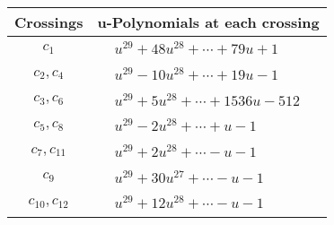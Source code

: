 \documentclass[1p]{elsarticle_modified}
\theoremstyle{definition}
\begin{document}
\begin{tabular}{m{50pt}|m{274pt}}
Crossings & \hspace{64pt}u-Polynomials at each crossing \\
\hline $$\begin{aligned}c_{1}\end{aligned}$$&$\begin{aligned}
&u^{29}+48 u^{28}+\cdots+79 u+1
\end{aligned}$\\
\hline $$\begin{aligned}c_{2},c_{4}\end{aligned}$$&$\begin{aligned}
&u^{29}-10 u^{28}+\cdots+19 u-1
\end{aligned}$\\
\hline $$\begin{aligned}c_{3},c_{6}\end{aligned}$$&$\begin{aligned}
&u^{29}+5 u^{28}+\cdots+1536 u-512
\end{aligned}$\\
\hline $$\begin{aligned}c_{5},c_{8}\end{aligned}$$&$\begin{aligned}
&u^{29}-2 u^{28}+\cdots+u-1
\end{aligned}$\\
\hline $$\begin{aligned}c_{7},c_{11}\end{aligned}$$&$\begin{aligned}
&u^{29}+2 u^{28}+\cdots- u-1
\end{aligned}$\\
\hline $$\begin{aligned}c_{9}\end{aligned}$$&$\begin{aligned}
&u^{29}+30 u^{27}+\cdots- u-1
\end{aligned}$\\
\hline $$\begin{aligned}c_{10},c_{12}\end{aligned}$$&$\begin{aligned}
&u^{29}+12 u^{28}+\cdots- u-1
\end{aligned}$\\
\hline
\end{tabular}\\~\\
\newpage\renewcommand{\arraystretch}{1}
\end{document}
